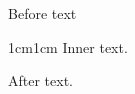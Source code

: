 \documentclass{article}
\begin{document}
Before text
\begin{adjustwidth}{1cm}{1cm}
Inner text.
\end{adjustwidth}
After text.
\end{document}
